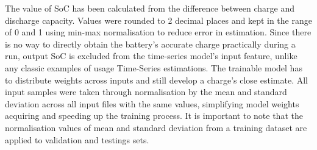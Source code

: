 
%
%
The value of SoC has been calculated from the difference between charge and discharge capacity.
Values were rounded to 2 decimal places and kept in the range of 0 and 1 using min-max normalisation to reduce error in estimation.
Since there is no way to directly obtain the battery's accurate charge practically during a run, output SoC is excluded from the time-series model's input feature, unlike any classic examples of usage Time-Series estimations.
The trainable model has to distribute weights across inputs and still develop a charge's close estimate.
All input samples were taken through normalisation by the mean and standard deviation across all input files with the same values, simplifying model weights acquiring and speeding up the training process.
It is important to note that the normalisation values of mean and standard deviation from a training dataset are applied to validation and testings sets.
